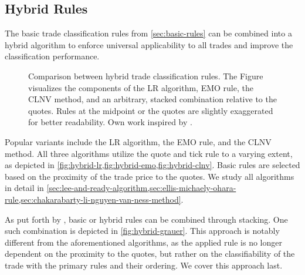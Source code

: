 \subsection{Hybrid Rules}\label{sec:hybrid-rules}

The basic trade classification rules from \cref{sec:basic-rules} can be combined into a hybrid algorithm to enforce universal applicability to all trades and improve the classification performance.


\begin{figure}[ht!]
    \hfill
    \hfill\null
    \caption[Comparison Between Hybrid Trade Classification Rules]{Comparison between hybrid trade classification rules. The Figure visualizes the components of the \acrshort{LR} algorithm, \acrshort{EMO} rule, the \acrshort{CLNV} method, and an arbitrary, stacked combination relative to the quotes. Rules at the midpoint or the quotes are slightly exaggerated for better readability. Own work inspired by \textcite[][167]{poppeSensitivityVPINChoice2016}.}
    \label{fig:hybrid-algorithms}
\end{figure}

Popular variants include the \gls{LR} algorithm, the \gls{EMO} rule, and the \gls{CLNV} method. All three algorithms utilize the quote and tick rule to a varying extent, as depicted in \cref{fig:hybrid-lr,fig:hybrid-emo,fig:hybrid-clnv}. Basic rules are selected based on the proximity of the trade price to the quotes. We study all algorithms in detail in \cref{sec:lee-and-ready-algorithm,sec:ellis-michaely-ohara-rule,sec:chakarabarty-li-nguyen-van-ness-method}.


As put forth by \textcite[][18]{grauerOptionTradeClassification2022}, basic or hybrid rules can be combined through stacking. One such combination is depicted in \cref{fig:hybrid-grauer}. This approach is notably different from the aforementioned algorithms, as the applied rule is no longer dependent on the proximity to the quotes, but rather on the classifiability of the trade with the primary rules and their ordering. We cover this approach last.

